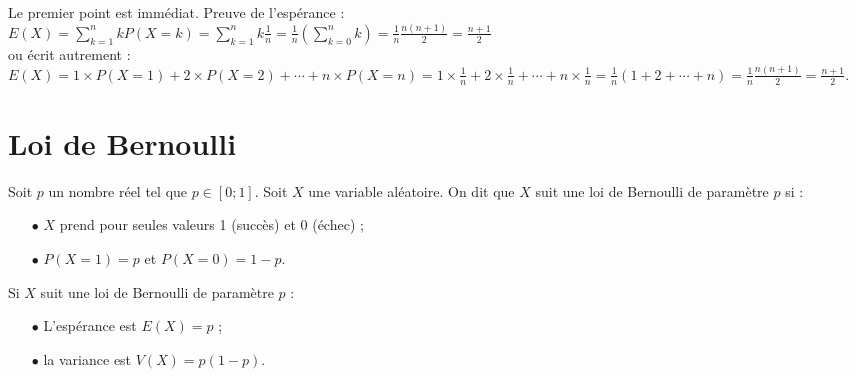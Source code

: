 \documentclass[french]{book}
\begin{document}
\begin{demo}
Le premier point est immédiat. Preuve de l'espérance :\\
$E(X)=\sum_{k=1}^{n}kP(X=k)=\sum_{k=1}^{n}k\frac{1}{n}=\frac{1}{n}(\sum_{k=0}^{n}k)=\frac{1}{n}\frac{n(n+1)}{2}=\frac{n+1}{2}$\\
ou écrit autrement :
$E(X)=1\times P(X=1)+2\times P(X=2)+\cdots +n\times P(X=n)=1\times \frac{1}{n}+2\times \frac{1}{n}+\cdots +n\times \frac{1}{n}=\frac{1}{n}(1+2+\cdots+n)=\frac{1}{n}\frac{n(n+1)}{2}=\frac{n+1}{2}$.

\end{demo}

\section{Loi de Bernoulli}



\begin{defn}
Soit $p$ un nombre réel tel que $p\in[0;1]$. Soit $X$ une variable aléatoire. On dit que $X$ suit une loi de Bernoulli de paramètre $p$ si :
\begin{itemize}
 \item[$\bullet$] $X$ prend pour seules valeurs 1 (\og{}succès\fg{}) et 0 (\og{}échec\fg{}) ;
\item[$\bullet$] $P(X=1)=p$ et $P(X=0)=1-p$.
\end{itemize}
\end{defn}


\begin{prop}
Si $X$ suit une loi de Bernoulli de paramètre $p$ :
\begin{itemize}
\item[$\bullet$] L'espérance est $E(X)=p$ ;
\item[$\bullet$] la variance est $V(X)=p(1-p)$.
\end{itemize}
\end{prop}
\end{document}
